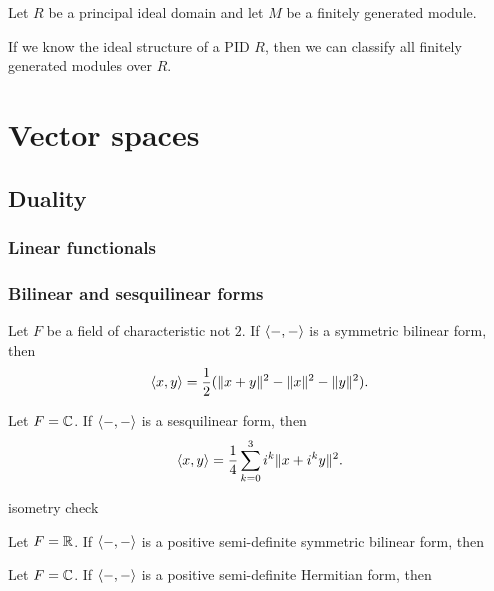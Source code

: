 \documentclass{../../large}
\begin{document}
\begin{prb}
Let $R$ be a principal ideal domain and let $M$ be a finitely generated module.

\end{prb}

If we know the ideal structure of a PID $R$, then we can classify all finitely generated modules over $R$.

\begin{prb}
\end{prb}
\begin{prb}
\end{prb}





\part{Vector spaces}


\chapter{Duality}
\section{Linear functionals}

\begin{prb}
\end{prb}


\section{Bilinear and sesquilinear forms}

\begin{prb}
\begin{parts}
\item Let $F$ be a field of characteristic not $2$. If $\langle-,-\rangle$ is a symmetric bilinear form, then
\[\langle x,y\rangle=\frac12(\|x+y\|^2-\|x\|^2-\|y\|^2).\]
\item Let $F=\mathbb{C}$. If $\langle-,-\rangle$ is a sesquilinear form, then
\[\langle x,y\rangle=\frac14\sum_{k=0}^3i^k\|x+i^ky\|^2.\]
\item isometry check
\end{parts}
\end{prb}

\begin{prb}
\begin{parts}
\item Let $F=\mathbb{R}$. If $\langle-,-\rangle$ is a positive semi-definite symmetric bilinear form, then
\item Let $F=\mathbb{C}$. If $\langle-,-\rangle$ is a positive semi-definite Hermitian form, then
\end{parts}
\end{prb}
\end{document}
